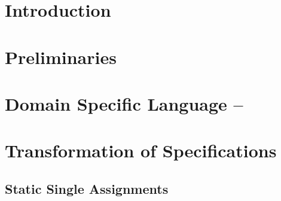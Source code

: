 \documentclass[sigconf]{acmart}
\begin{document}


\maketitle

\section{Introduction}
\label{section:introduction}



\section{Preliminaries}
\label{section:preliminaries}



\section{Domain Specific Language -- \bvdsl}
\label{section:domain-specific-language-bvdsl}



\section{Transformation of Specifications}
\label{section:translation}


\subsection{Static Single Assignments}
\label{subsection:translation:static-single-assignment}


\subsection{\zdsl}
\label{subsection:domain-specific-language-zdsl}


%
\end{document}
